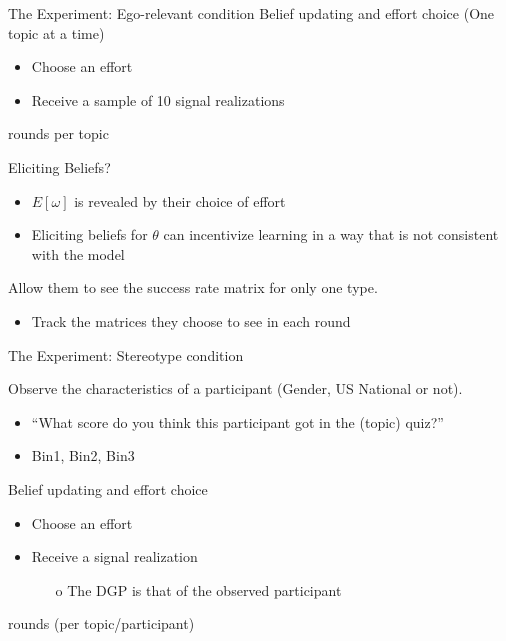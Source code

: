 \documentclass[aspectratio=169]{beamer}
\begin{document}
\begin{frame}{The Experiment: Ego-relevant condition}
Belief updating and effort choice (One topic at a time)\\
\bigskip
\begin{itemize}
    \item Choose an effort
    \item Receive a sample of 10 signal realizations
\end{itemize}
 rounds per topic

\end{frame}

\begin{frame}{Eliciting Beliefs?}
\begin{itemize}
    \item $E[\omega]$ is revealed by their choice of effort\\
    \bigskip
    \item Eliciting beliefs for $\theta$ can incentivize learning in a way that is not consistent with the model\\
    \bigskip
\end{itemize}

Allow them to see the success rate matrix for only one type. 
\begin{itemize}
    \item Track the matrices they choose to see in each round
\end{itemize}



\end{frame}

\begin{frame}{The Experiment: Stereotype condition}

Observe the characteristics of a participant (Gender, US National or not). \\
\begin{itemize}
    \item ``What score do you think this participant got in the (topic) quiz?'' \\
    \item Bin1, Bin2, Bin3 \\
\end{itemize}
\bigskip
Belief updating and effort choice\\

\begin{itemize}
    \item Choose an effort
    \item Receive a signal realization
    \begin{itemize}
        \item[o] The DGP is that of the observed participant
    \end{itemize}
\end{itemize}
 rounds (per topic/participant)

\end{frame}
\end{document}
